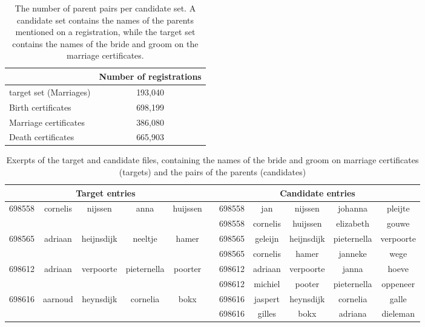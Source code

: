 \begin{table}
	\centering
	\caption[Number of registration in matching sets]{\label{tab:number_of_registations} The number of parent pairs per candidate set. A candidate set contains the names of the parents mentioned on a registration, while the target set contains the names of the bride and groom on the marriage certificates.}
	\begin{tabular}{lc}
		\toprule
		 & Number of registrations\\
		 \toprule
		 target set (Marriages) & 193,040\\
		 \midrule
		 Birth certificates & 698,199\\
		 Marriage certificates & 386,080\\
		 Death certificates & 665,903\\
		 \bottomrule		 
	\end{tabular}
\end{table}

\begin{table}
	\centering
	\caption[Example of target and candidate files]{\label{tab:exerpt_of_target_file}Exerpts of the target and candidate files, containing the names of the bride and groom on marriage certificates (targets) and the pairs of the parents (candidates)}
	\resizebox{\columnwidth}{!} {
		\begin{tabular}{l*4{c}|l|l*4{c}}
			\toprule
			\multicolumn{5}{c|}{Target entries} && \multicolumn{5}{c}{Candidate entries}\\
			\midrule
			698558 	& cornelis 	& nijssen 		& anna 			& huijssen	 	&& 698558 & jan 		& nijssen 		& johanna 		& pleijte\\
					& 			& 				&	 			& 				&& 698558 & cornelis 	& huijssen 		& elizabeth 	& gouwe\\
			698565 	& adriaan 	& heijnsdijk 	& neeltje 		& hamer 		&& 698565 & geleijn 	& heijnsdijk	& pieternella 	& verpoorte\\
					& 			& 				& 				& 				&& 698565 & cornelis 	& hamer 		& janneke 		& wege\\
			698612 	& adriaan 	& verpoorte 	& pieternella 	& poorter 		&& 698612 & adriaan 	& verpoorte 	& janna 		& hoeve\\
					& 			&  				& 				& 				&& 698612 & michiel 	& pooter 		& pieternella 	& oppeneer\\
			698616 	& aarnoud 	& heynsdijk 	& cornelia 		& bokx 			&& 698616 & jaspert 	& heynsdijk 	& cornelia 		& galle\\
					& 		 	&  				& 				& 				&& 698616 & gilles 		& bokx 			& adriana 		& dieleman\\
			\bottomrule
		\end{tabular}
	}
\end{table}